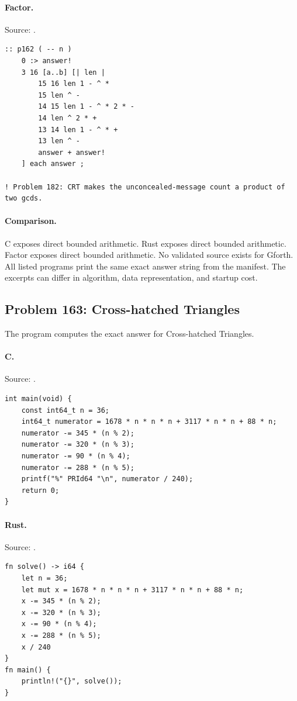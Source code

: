 \paragraph{Factor.} Source: .
\begin{lstlisting}
:: p162 ( -- n )
    0 :> answer!
    3 16 [a..b] [| len |
        15 16 len 1 - ^ *
        15 len ^ -
        14 15 len 1 - ^ * 2 * -
        14 len ^ 2 * +
        13 14 len 1 - ^ * +
        13 len ^ -
        answer + answer!
    ] each answer ;

! Problem 182: CRT makes the unconcealed-message count a product of two gcds.
\end{lstlisting}

\paragraph{Comparison.}
C exposes direct bounded arithmetic. Rust exposes direct bounded arithmetic. Factor exposes direct bounded arithmetic.
No validated source exists for Gforth.
All listed programs print the same exact answer string from the manifest. The excerpts can differ in algorithm, data representation, and startup cost.

\subsection{Problem 163: Cross-hatched Triangles}
\label{walkthrough:p163}
The program computes the exact answer for Cross-hatched Triangles.

\paragraph{C.} Source: .
\begin{lstlisting}
int main(void) {
    const int64_t n = 36;
    int64_t numerator = 1678 * n * n * n + 3117 * n * n + 88 * n;
    numerator -= 345 * (n % 2);
    numerator -= 320 * (n % 3);
    numerator -= 90 * (n % 4);
    numerator -= 288 * (n % 5);
    printf("%" PRId64 "\n", numerator / 240);
    return 0;
}
\end{lstlisting}

\paragraph{Rust.} Source: .
\begin{lstlisting}
fn solve() -> i64 {
    let n = 36;
    let mut x = 1678 * n * n * n + 3117 * n * n + 88 * n;
    x -= 345 * (n % 2);
    x -= 320 * (n % 3);
    x -= 90 * (n % 4);
    x -= 288 * (n % 5);
    x / 240
}
fn main() {
    println!("{}", solve());
}
\end{lstlisting}

